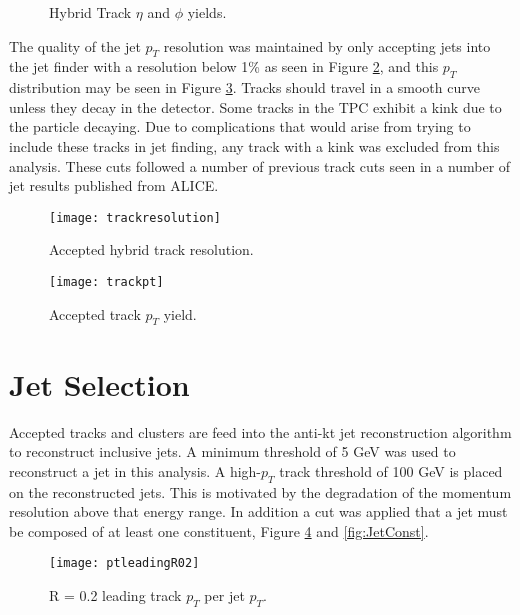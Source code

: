 \begin{figure}%
    \centering
    \qquad
    \caption{Hybrid Track $\eta$ and $\phi$ yields.}%
    \label{fig:Hybridtracketaphi}%
\end{figure}


The quality of the jet $p_{T}$ resolution was maintained by only accepting jets into the jet finder with a resolution below 1\% as seen in Figure \ref{fig:trackresolution}, and this $p_{T}$ distribution may be seen in Figure \ref{fig:hybtrackpt}.  Tracks should travel in a smooth curve unless they decay in the detector.  Some tracks in the TPC exhibit a kink due to the particle decaying.  Due to complications that would arise from trying to include these tracks in jet finding, any track with a kink was excluded from this analysis.  These cuts followed a number of previous track cuts seen in a number of jet results published from ALICE\cite{Acharya:2018eat}.

\begin{figure}[h]
\texttt{[image: trackresolution]}
\centering
\caption{Accepted hybrid track resolution.}
\label{fig:trackresolution}
\end{figure}

\begin{figure}[h]
\texttt{[image: trackpt]}
\centering
\caption{Accepted track $p_{T}$ yield.}
\label{fig:hybtrackpt}
\end{figure}


\section{Jet Selection}

Accepted tracks and clusters are feed into the anti-kt jet reconstruction algorithm to reconstruct inclusive jets.  A minimum threshold of 5 GeV was used to reconstruct a jet in this analysis.  A high-$p_{T}$ track threshold of 100 GeV is placed on the reconstructed jets.  This is motivated by the degradation of the momentum resolution above that energy range.  In addition a cut was applied that a jet must be composed of at least one constituent, Figure \ref{fig:JetPt} and \ref{fig:JetConst}.

\begin{figure}[h]
\texttt{[image: ptleadingR02]}
\centering
\caption{R = 0.2 leading track $p_{T}$ per jet $p_{T}$.}
\label{fig:JetPt}
\end{figure}


